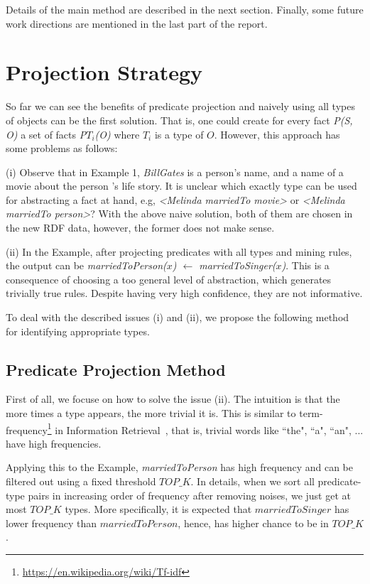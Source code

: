 \documentclass{acm_proc_article-sp}
\begin{document}
Details of the main method are described in the next section. Finally, some future work directions are mentioned in the last part of the report.

\section{Projection Strategy}

So far we can see the benefits of predicate projection and naively using all types of objects can be the first solution. That is, one could create for every fact \textit{P(S, O)} a set of facts \textit{P$T_{i}$(O)} where \textit{$T_{i}$} is a type of $O$. However, this approach has some problems as follows:

(i) Observe that in Example 1, \textit{BillGates} is a person's name, and a name of a movie about the person 's life story. It is unclear which exactly type can be used for abstracting a fact at hand, e.g, \textit{<Melinda marriedTo movie>} or \textit{<Melinda marriedTo person>}? With the above naive solution, both of them are chosen in the new RDF data, however, the former does not make sense.

(ii) In the Example, after projecting predicates with all types and mining rules, the output can be \textit{marriedToPerson($x$) $\leftarrow$ marriedToSinger($x$)}. This is a consequence of choosing a too general level of abstraction, which generates trivially true rules. Despite having very high confidence, they are not informative.

To deal with the described issues (i) and (ii), we propose the following method for identifying appropriate types.

\subsection{Predicate Projection Method}

First of all, we focuse on how to solve the issue (ii). The intuition is that the more times a type appears, the more trivial it is. This is similar to term-frequency\footnote{\url{https://en.wikipedia.org/wiki/Tf-idf}} in Information Retrieval~\cite{ref2}, that is, trivial words like ``the", ``a", ``an", ... have high frequencies.

Applying this to the Example, \textit{marriedToPerson} has high frequency and can be filtered out using a fixed threshold $TOP\_K$. In details, when we sort all predicate-type pairs in increasing order of frequency after removing noises, we just get at most $TOP\_K$ types. More specifically, it is expected that $marriedToSinger$ has lower frequency than $marriedToPerson$, hence, has higher chance to be in $TOP\_K$.
\end{document}
